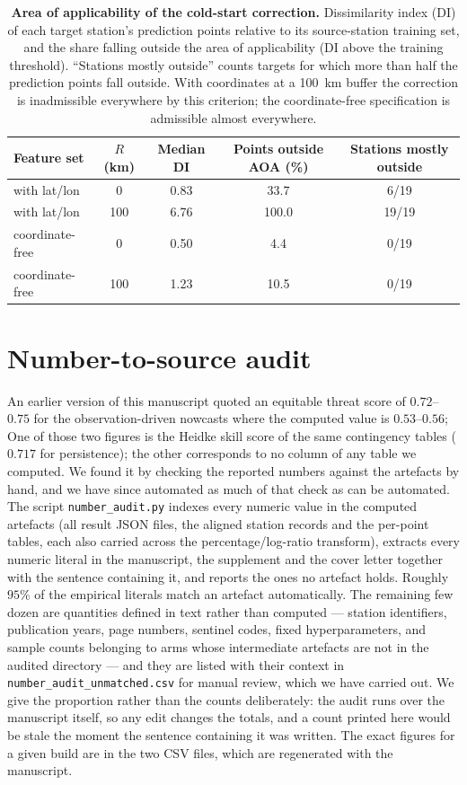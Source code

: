 \documentclass[11pt]{article}
\begin{document}
\begin{table}[htbp]\centering\footnotesize
\caption{\textbf{Area of applicability of the cold-start correction.} Dissimilarity index (DI) of each target station's prediction points relative to its source-station training set, and the share falling outside the area of applicability (DI above the training threshold). ``Stations mostly outside'' counts targets for which more than half the prediction points fall outside. With coordinates at a 100~km buffer the correction is inadmissible everywhere by this criterion; the coordinate-free specification is admissible almost everywhere.}
\begin{tabular}{lcccc}\toprule
Feature set & $R$ (km) & Median DI & Points outside AOA (\%) & Stations mostly outside \\ \midrule
with lat/lon & 0 & 0.83 & 33.7 & 6/19 \\
with lat/lon & 100 & 6.76 & 100.0 & 19/19 \\
coordinate-free & 0 & 0.50 & 4.4 & 0/19 \\
coordinate-free & 100 & 1.23 & 10.5 & 0/19 \\
\bottomrule\end{tabular}\end{table}


\section{Number-to-source audit}
An earlier version of this manuscript quoted an equitable threat score of $0.72$--$0.75$
for the observation-driven nowcasts where the computed value is $0.53$--$0.56$; One of those
two figures is the Heidke skill score of the same contingency tables ($0.717$ for
persistence); the other corresponds to no column of any table we computed. We found it by
checking the reported numbers against the artefacts by hand, and we have since automated
as much of that check as can be automated. The script \texttt{number\_audit.py} indexes
every numeric value in the computed artefacts (all result JSON files, the aligned station
records and the per-point tables, each also carried across the percentage/log-ratio
transform), extracts every numeric literal in the manuscript, the supplement and the cover
letter together with the sentence containing it, and reports the ones no artefact holds.
Roughly $95\%$ of the empirical literals match an artefact automatically. The remaining
few dozen are quantities defined in text rather than computed --- station identifiers,
publication years, page numbers, sentinel codes, fixed hyperparameters, and sample counts
belonging to arms whose intermediate artefacts are not in the audited directory --- and
they are listed with their context in
\texttt{number\_audit\_unmatched.csv} for manual review, which we have carried out. We
give the proportion rather than the counts deliberately: the audit runs over the
manuscript itself, so any edit changes the totals, and a count printed here would be stale
the moment the sentence containing it was written. The exact figures for a given build are
in the two CSV files, which are regenerated with the manuscript.
\end{document}
